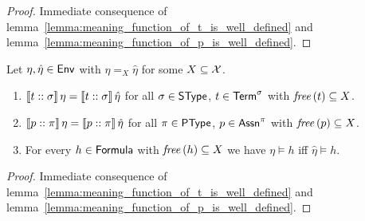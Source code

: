 \documentclass[12pt,a4paper]{report}
\begin{document}
\begin{proof}
  Immediate consequence of lemma~\ref{lemma:meaning_function_of_t_is_well_defined}
  and lemma~\ref{lemma:meaning_function_of_p_is_well_defined}.
\end{proof}

\begin{theorem}[Coincidence] \label{theorem:coincidence}
  Let $\eta,\hat{\eta}\in\mathsf{Env}$ with $\eta =_X \hat{\eta}$ for some $X \subseteq \mathcal{X}$.
  \begin{enumerate}
    \item $\llbracket{t}\mathrel{::}{\sigma}\rrbracket\,\eta = \llbracket{t}\mathrel{::}{\sigma}\rrbracket\,\hat{\eta}$
          for all $\sigma\in\mathsf{SType}$, $t \in\mathsf{Term}^\sigma$ with $\mathit{free}\,(t) \subseteq X$.
    \item $\llbracket{p}\mathrel{::}{\pi}\rrbracket\,\eta = \llbracket{p}\mathrel{::}{\pi}\rrbracket\,\hat{\eta}$
          for all $\pi\in\mathsf{PType}$, $p \in \mathsf{Assn}^\pi$ with $\mathit{free}\,(p) \subseteq X$.
    \item For every $h \in \mathsf{Formula}$
          with $\mathit{free}\,(h) \subseteq X$ we have $\eta \models h$ iff $\hat{\eta} \models h$.
  \end{enumerate}
\end{theorem}

\begin{proof}
  Immediate consequence of lemma~\ref{lemma:meaning_function_of_t_is_well_defined}
  and lemma~\ref{lemma:meaning_function_of_p_is_well_defined}.
\end{proof}
\end{document}
